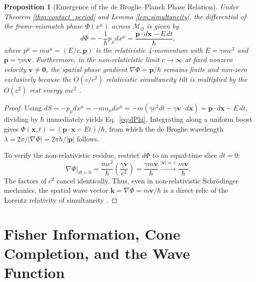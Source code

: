 \documentclass[11pt, a4paper]{article}
\newtheorem{proposition}[theorem]{Proposition}
\theoremstyle{definition}
\begin{document}
\begin{proposition}[Emergence of the de Broglie--Planck Phase Relation]
\label{prop:debroglie}
Under Theorem \ref{thm:contact_period} and Lemma \ref{lem:simultaneity}, the differential of the frame-mismatch phase $\Phi(x^\mu)$ across $\mathcal{M}_{\mathcal{O}}$ is given by
\begin{equation}
\label{eq:dPhi}
d\Phi = -\frac{1}{\hbar} p_\mu dx^\mu = \frac{\mathbf{p} \cdot d\mathbf{x} - E\,dt}{\hbar},
\end{equation}
where $p^\mu = m u^\mu = (E/c, \mathbf{p})$ is the relativistic 4-momentum with $E = \gamma mc^2$ and $\mathbf{p} = \gamma m \mathbf{v}$. Furthermore, in the non-relativistic limit $c \to \infty$ at fixed nonzero velocity $\mathbf{v} \neq \mathbf{0}$, the spatial phase gradient $\nabla \Phi = \mathbf{p}/\hbar$ remains finite and non-zero exclusively because the $O(v/c^2)$ relativistic simultaneity tilt is multiplied by the $O(c^2)$ rest energy $mc^2$ \cite{deBroglie1924, Greenberger2001}.
\end{proposition}

\begin{proof}
Using $dS = -p_\mu dx^\mu = -m u_\mu dx^\mu = -m(\gamma c^2 dt - \gamma \mathbf{v}\cdot d\mathbf{x}) = \mathbf{p}\cdot d\mathbf{x} - E\,dt$, dividing by $\hbar$ immediately yields Eq.~\eqref{eq:dPhi}. Integrating along a uniform boost gives $\Phi(\mathbf{x}, t) = (\mathbf{p}\cdot\mathbf{x} - Et)/\hbar$, from which the de Broglie wavelength $\lambda = 2\pi / |\nabla\Phi| = 2\pi\hbar / |\mathbf{p}|$ follows.

To verify the non-relativistic residue, restrict $d\Phi$ to an equal-time slice $dt = 0$:
\begin{equation}
\left. \nabla \Phi \right|_{dt=0} = \frac{m c^2}{\hbar} \left( \frac{\gamma \mathbf{v}}{c^2} \right) = \frac{\gamma m \mathbf{v}}{\hbar} \xrightarrow{|\mathbf{v}| \ll c} \frac{m\mathbf{v}}{\hbar}.
\end{equation}
The factors of $c^2$ cancel identically. Thus, even in non-relativistic Schr\"{o}dinger mechanics, the spatial wave vector $\mathbf{k} = \nabla \Phi = m\mathbf{v}/\hbar$ is a direct relic of the Lorentz relativity of simultaneity \cite{Greenberger2001}.
\end{proof}

\section{Fisher Information, Cone Completion, and the Wave Function}
\label{sec:info_geom}
\end{document}
